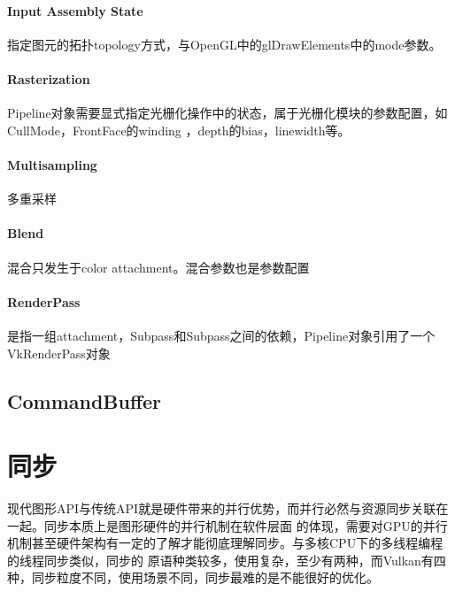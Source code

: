 \paragraph{Input Assembly State}
指定图元的拓扑topology方式，与OpenGL中的glDrawElements中的mode参数。

\paragraph{Rasterization}
Pipeline对象需要显式指定光栅化操作中的状态，属于光栅化模块的参数配置，如CullMode，FrontFace的winding
，depth的bias，linewidth等。

\paragraph{Multisampling}
多重采样

\paragraph{Blend}
混合只发生于color attachment。混合参数也是参数配置

\paragraph{RenderPass}
是指一组attachment，Subpass和Subpass之间的依赖，Pipeline对象引用了一个VkRenderPass对象

\subsection{CommandBuffer}



\section{同步}
现代图形API与传统API就是硬件带来的并行优势，而并行必然与资源同步关联在一起。同步本质上是图形硬件的并行机制在软件层面
的体现，需要对GPU的并行机制甚至硬件架构有一定的了解才能彻底理解同步。与多核CPU下的多线程编程的线程同步类似，同步的
原语种类较多，使用复杂，至少有两种，而Vulkan有四种，同步粒度不同，使用场景不同，同步最难的是不能很好的优化。

